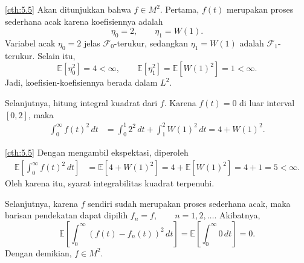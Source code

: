 \documentclass[aspectratio=169,11pt]{beamer}
\theoremstyle{definition}
\newcommand{\myref}[1]{\hyperref[#1]{\nameCref{#1} \ref*{#1}}}
\begin{document}
\begin{frame}{\insertsection}{\insertsubsection}
  \begin{exampleblock}{\myref{cth:5.5}}
    Akan ditunjukkan bahwa $f\in M^2$. Pertama, $f(t)$ merupakan proses sederhana
    acak karena koefisiennya adalah
    \[
      \eta_0=2,
      \qquad
      \eta_1=W(1).
    \]
    Variabel acak $\eta_0=2$ jelas $\mathcal{F}_0$-terukur, sedangkan
    $\eta_1=W(1)$ adalah $\mathcal{F}_1$-terukur. Selain itu,
    \[
      \mathbb{E}[\eta_0^2]=4<\infty,
      \qquad
      \mathbb{E}[\eta_1^2]
      =
      \mathbb{E}[W(1)^2]
      =
      1<\infty.
    \]
    Jadi, koefisien-koefisiennya berada dalam $L^2$.

    Selanjutnya, hitung integral kuadrat dari $f$. Karena $f(t)=0$ di luar interval
    $[0,2]$, maka
    \[
      \begin{aligned}
        \int_0^\infty f(t)^2\,dt
         & =
        \int_0^1 2^2\,dt
        +
        \int_1^2 W(1)^2\,dt =
        4 + W(1)^2.
      \end{aligned}
    \]
  \end{exampleblock}
\end{frame}

\begin{frame}{\insertsection}{\insertsubsection}
  \begin{exampleblock}{\myref{cth:5.5}}
    Dengan mengambil ekspektasi, diperoleh
    \[
      \begin{aligned}
        \mathbb{E}\left[\int_0^\infty f(t)^2\,dt\right]
         & =
        \mathbb{E}\left[4+W(1)^2\right] =
        4+\mathbb{E}[W(1)^2]          =
        4+1 =
        5<\infty.
      \end{aligned}
    \]
    Oleh karena itu, syarat integrabilitas kuadrat terpenuhi.

    Selanjutnya, karena $f$ sendiri sudah merupakan proses sederhana acak, maka
    barisan pendekatan dapat dipilih
    $
      f_n=f,
      \qquad n=1,2,\ldots.
    $
    Akibatnya,
    \[
      \mathbb{E}\left[
        \int_0^\infty (f(t)-f_n(t))^2\,dt
        \right]
      =
      \mathbb{E}\left[
        \int_0^\infty 0\,dt
        \right]
      =
      0.
    \]
    Dengan demikian, $f\in M^2$.
  \end{exampleblock}
\end{frame}
\end{document}

